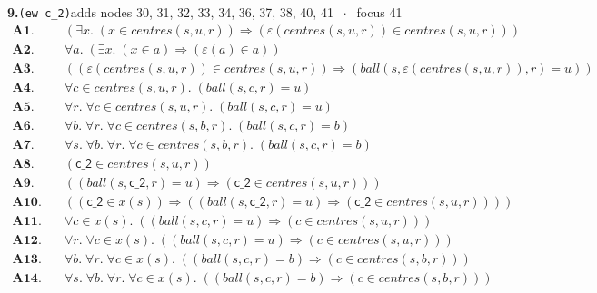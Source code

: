 \documentclass[11pt]{article}
\begin{document}
\medskip\noindent\textbf{9.}\quad \texttt{(ew c\_2)}\hfill{\small adds nodes 30, 31, 32, 33, 34, 36, 37, 38, 40, 41 $\;\cdot\;$ focus 41}\\[2pt]
\begin{align*}
  \mathbf{A1.}\quad & (\exists x.\; (x \in \mathit{centres}(s, u, r)) \Rightarrow (\varepsilon(\mathit{centres}(s, u, r)) \in \mathit{centres}(s, u, r))) \\
  \mathbf{A2.}\quad & \forall a.\; (\exists x.\; (x \in a) \Rightarrow (\varepsilon(a) \in a)) \\
  \mathbf{A3.}\quad & ((\varepsilon(\mathit{centres}(s, u, r)) \in \mathit{centres}(s, u, r)) \Rightarrow (\mathit{ball}(s, \varepsilon(\mathit{centres}(s, u, r)), r) = u)) \\
  \mathbf{A4.}\quad & \forall c \in \mathit{centres}(s, u, r).\; (\mathit{ball}(s, c, r) = u) \\
  \mathbf{A5.}\quad & \forall r.\; \forall c \in \mathit{centres}(s, u, r).\; (\mathit{ball}(s, c, r) = u) \\
  \mathbf{A6.}\quad & \forall b.\; \forall r.\; \forall c \in \mathit{centres}(s, b, r).\; (\mathit{ball}(s, c, r) = b) \\
  \mathbf{A7.}\quad & \forall s.\; \forall b.\; \forall r.\; \forall c \in \mathit{centres}(s, b, r).\; (\mathit{ball}(s, c, r) = b) \\
  \mathbf{A8.}\quad & (\mathsf{c\_2} \in \mathit{centres}(s, u, r)) \\
  \mathbf{A9.}\quad & ((\mathit{ball}(s, \mathsf{c\_2}, r) = u) \Rightarrow (\mathsf{c\_2} \in \mathit{centres}(s, u, r))) \\
  \mathbf{A10.}\quad & ((\mathsf{c\_2} \in x(s)) \Rightarrow ((\mathit{ball}(s, \mathsf{c\_2}, r) = u) \Rightarrow (\mathsf{c\_2} \in \mathit{centres}(s, u, r)))) \\
  \mathbf{A11.}\quad & \forall c \in x(s).\; ((\mathit{ball}(s, c, r) = u) \Rightarrow (c \in \mathit{centres}(s, u, r))) \\
  \mathbf{A12.}\quad & \forall r.\; \forall c \in x(s).\; ((\mathit{ball}(s, c, r) = u) \Rightarrow (c \in \mathit{centres}(s, u, r))) \\
  \mathbf{A13.}\quad & \forall b.\; \forall r.\; \forall c \in x(s).\; ((\mathit{ball}(s, c, r) = b) \Rightarrow (c \in \mathit{centres}(s, b, r))) \\
  \mathbf{A14.}\quad & \forall s.\; \forall b.\; \forall r.\; \forall c \in x(s).\; ((\mathit{ball}(s, c, r) = b) \Rightarrow (c \in \mathit{centres}(s, b, r))) \\

\end{align*}
\end{document}
